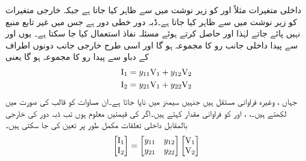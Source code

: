  داخلی متغیرات مثلاً  اور  کو زیر نوشت میں  سے ظاہر کیا جاتا ہے  جبکہ خارجی متغیرات کو زیر نوشت میں  سے ظاہر کیا جاتا ہے۔ڈبہ دور خطی دور ہے جس میں غیر تابع منبع نہیں پائے جاتے لہٰذا  اور  حاصل کرتے ہوئے مسئلہ نفاذ استعمال کیا جا سکتا ہے۔ یوں  اور  سے پیدا داخلی جانب رو کا مجموعہ  ہو گا اور اسی طرح خارجی جانب دونوں اطراف کے دباو سے پیدا رو کا مجموعہ  ہو گا یعنی
\begin{gather}
\begin{aligned}\label{مساوات_نمونہ_الف}
{\ensuremath{{\textup{I}}}}_1&=y_{11}{{\textup{V}}}_1+y_{12}{{\textup{V}}}_2\\
{{\textup{I}}}_2&=y_{21}{{\textup{V}}}_1+y_{22}{{\textup{V}}}_2
\end{aligned}
\end{gather}  
جہاں ،  وغیرہ فراوانی مستقل ہیں جنہیں سیمنز  میں ناپا جاتا ہے۔ان مساوات کو قالب کی صورت میں لکھتے ہیں۔، ،  اور  کو فراوانی مقدار  کہتے ہیں۔اگر  کی قیمتیں معلوم ہوں تب ڈبہ دور کی خارجی بالمقابل داخلی تعلقات مکمل طور پر تعین کی جا سکتی ہیں۔ 
\begin{align}\label{مساوات_نمونہ_ب}
\begin{bmatrix}
{\ensuremath{{\textup{I}}}}_1 \\
{{\textup{I}}}_2
\end{bmatrix}
=
\begin{bmatrix}
y_{11} & y_{12}\\
y_{21} & y_{22}
\end{bmatrix}
\begin{bmatrix}
{\ensuremath{{\textup{V}}}}_1\\
{{\textup{V}}}_2
\end{bmatrix}
\end{align}

